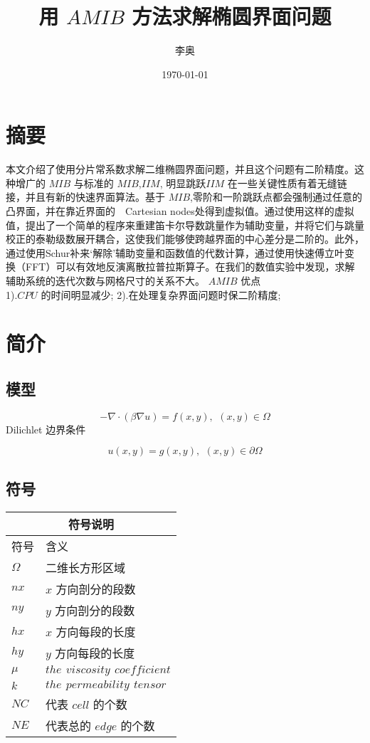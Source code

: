 \documentclass{article}
\begin{document}
\title{用 $AMIB$ 方法求解椭圆界面问题}
\author{李奥}
\date{\today}
\maketitle
\tableofcontents
\section{摘要}
本文介绍了使用分片常系数求解二维椭圆界面问题，并且这个问题有二阶精度。这种增广的 $MIB$ 与标准的 $MIB$,$IIM$, 明显跳跃$IIM$ 在一些关键性质有着无缝链接，并且有新的快速界面算法。基于 $MIB$,零阶和一阶跳跃点都会强制通过任意的凸界面，并在靠近界面的　Cartesian nodes处得到虚拟值。通过使用这样的虚拟值，提出了一个简单的程序来重建笛卡尔导数跳量作为辅助变量，并将它们与跳量校正的泰勒级数展开耦合，这使我们能够使跨越界面的中心差分是二阶的。此外，通过使用Schur补来‘解除’辅助变量和函数值的代数计算，通过使用快速傅立叶变换（FFT）可以有效地反演离散拉普拉斯算子。在我们的数值实验中发现，求解辅助系统的迭代次数与网格尺寸的关系不大。
$AMIB$ 优点\\
1).$CPU$ 的时间明显减少;
2).在处理复杂界面问题时保二阶精度; 

\section{简介}
\subsection{模型}

\begin{equation}
-\nabla \cdot (\beta\nabla u) = f(x,y),\,\ (x,y)\in \Omega
\end{equation}
Dilichlet 边界条件

\begin{equation}
u(x,y) = g(x,y),\,\ (x,y)\in \partial \Omega
\end{equation}
\subsection{符号}
\begin{tabular}{ |l|l| }   
\hline   
\multicolumn{2}{|c|}{符号说明} \\   
\hline
符号 & 含义 \\
\hline
$\Omega$ & 二维长方形区域 \\
\hline
$nx$ & $x$ 方向剖分的段数 \\
\hline
$ny$ & $y$ 方向剖分的段数 \\
\hline
$hx$ &  $x$ 方向每段的长度\\
\hline
$hy$ &  $y$ 方向每段的长度 \\
\hline
$\mu$ & $the \,\ viscosity \,\ coefficient$ \\
\hline
$k$ & $the \,\ permeability \,\ tensor$ \\
\hline 
$NC$ & 代表 $cell$ 的个数 \\
\hline
$NE$ & 代表总的 $edge$ 的个数 \\
\hline
\end{tabular}
\end{document}
